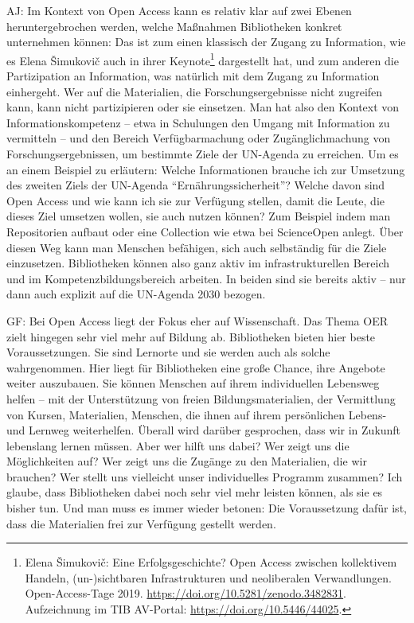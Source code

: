 \documentclass[a4paper,
fontsize=11pt,
oneside,
numbers=noperiodatend,
parskip=half-,
bibliography=totoc,
final
]{scrartcl}
\begin{document}
AJ: Im Kontext von Open Access kann es relativ klar auf zwei Ebenen
heruntergebrochen werden, welche Maßnahmen Bibliotheken konkret
unternehmen können: Das ist zum einen klassisch der Zugang zu
Information, wie es Elena Šimukovič auch in ihrer Keynote\footnote{Elena
  Šimukovič: Eine Erfolgsgeschichte? Open Access zwischen kollektivem
  Handeln, (un-)sichtbaren Infrastrukturen und neoliberalen
  Verwandlungen. Open-Access-Tage 2019.
  \url{https://doi.org/10.5281/zenodo.3482831}. Aufzeichnung im TIB
  AV-Portal: \url{https://doi.org/10.5446/44025}.} dargestellt hat, und
zum anderen die Partizipation an Information, was natürlich mit dem
Zugang zu Information einhergeht. Wer auf die Materialien, die
Forschungsergebnisse nicht zugreifen kann, kann nicht partizipieren oder
sie einsetzen. Man hat also den Kontext von Informationskompetenz --
etwa in Schulungen den Umgang mit Information zu vermitteln -- und den
Bereich Verfügbarmachung oder Zugänglichmachung von
Forschungsergebnissen, um bestimmte Ziele der UN-Agenda zu erreichen. Um
es an einem Beispiel zu erläutern: Welche Informationen brauche ich zur
Umsetzung des zweiten Ziels der UN-Agenda \enquote{Ernährungssicherheit}?
Welche davon sind Open Access und wie kann ich sie zur Verfügung
stellen, damit die Leute, die dieses Ziel umsetzen wollen, sie auch
nutzen können? Zum Beispiel indem man Repositorien aufbaut oder eine
Collection wie etwa bei ScienceOpen anlegt. Über diesen Weg kann man
Menschen befähigen, sich auch selbständig für die Ziele einzusetzen.
Bibliotheken können also ganz aktiv im infrastrukturellen Bereich und im
Kompetenzbildungsbereich arbeiten. In beiden sind sie bereits aktiv --
nur dann auch explizit auf die UN-Agenda 2030 bezogen.

GF: Bei Open Access liegt der Fokus eher auf Wissenschaft. Das Thema OER
zielt hingegen sehr viel mehr auf Bildung ab. Bibliotheken bieten hier
beste Voraussetzungen. Sie sind Lernorte und sie werden auch als solche
wahrgenommen. Hier liegt für Bibliotheken eine große Chance, ihre
Angebote weiter auszubauen. Sie können Menschen auf ihrem individuellen
Lebensweg helfen -- mit der Unterstützung von freien
Bildungsmaterialien, der Vermittlung von Kursen, Materialien, Menschen,
die ihnen auf ihrem persönlichen Lebens- und Lernweg weiterhelfen.
Überall wird darüber gesprochen, dass wir in Zukunft lebenslang lernen
müssen. Aber wer hilft uns dabei? Wer zeigt uns die Möglichkeiten auf?
Wer zeigt uns die Zugänge zu den Materialien, die wir brauchen? Wer
stellt uns vielleicht unser individuelles Programm zusammen? Ich glaube,
dass Bibliotheken dabei noch sehr viel mehr leisten können, als sie es
bisher tun. Und man muss es immer wieder betonen: Die Voraussetzung
dafür ist, dass die Materialien frei zur Verfügung gestellt werden.
\end{document}
